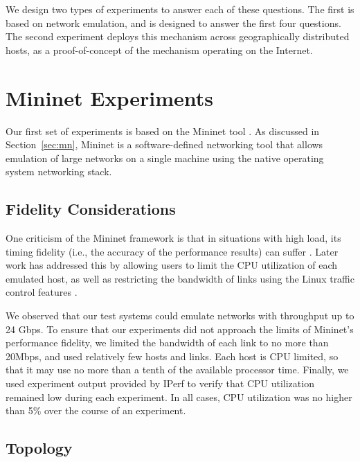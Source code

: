 \documentclass{cwru}
\begin{document}
We design two types of experiments to answer each of these questions. The first
is based on network emulation, and is designed to answer the first four
questions. The second experiment deploys this mechanism across geographically
distributed hosts, as a proof-of-concept of the mechanism operating on the
Internet.

\section{Mininet Experiments}

Our first set of experiments is based on the Mininet tool \cite{mininet}. As
discussed in Section~\ref{sec:mn}, Mininet is a software-defined networking tool
that allows emulation of large networks on a single machine using the native
operating system networking stack.

\subsection{Fidelity Considerations}

One criticism of the Mininet framework is that in situations with high load, its
timing fidelity (i.e., the accuracy of the performance results) can suffer
\cite{lantz2010network}. Later work has addressed this by allowing users to
limit the CPU utilization of each emulated host, as well as restricting the
bandwidth of links using the Linux traffic control features
\cite{handigol2012reproducible}.

We observed that our test systems could emulate networks with throughput up to
24 Gbps. To ensure that our experiments did not approach the limits of Mininet's
performance fidelity, we limited the bandwidth of each link to no more than
20Mbps, and used relatively few hosts and links. Each host is CPU limited, so
that it may use no more than a tenth of the available processor time. Finally,
we used experiment output provided by IPerf to verify that CPU utilization
remained low during each experiment. In all cases, CPU utilization was no higher
than 5\% over the course of an experiment.

\subsection{Topology}
\end{document}
